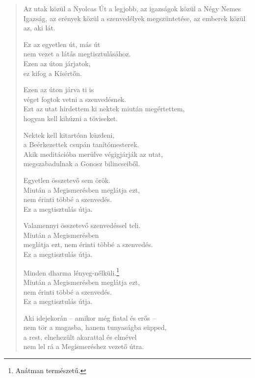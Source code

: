 
\begin{verse}

{\par%
\lettrine{A}{z} {\LettrineTextFont utak közül a Nyolcas Út a legjobb,}\newline
az igazságok közül a Négy Nemes Igazság,\newline
az erények közül a szenvedélyek megszüntetése,\verselinebreak
az emberek közül az, aki lát.
\par}

 Ez az egyetlen út, más út\\
nem vezet a látás megtisztulásához.\\
Ezen az úton járjatok,\\
ez kifog a Kísértőn.

 Ezen az úton járva ti is\\
véget fogtok vetni a szenvedésnek.\\
Ezt az utat hirdettem ki nektek miután megértettem,\\
hogyan kell kihúzni a töviseket.

 Nektek kell kitartóan küzdeni,\\
a Beérkezettek csupán tanítómesterek.\\
Akik meditációba merülve végigjárják az utat,\\
megszabadulnak a Gonosz bilincseiből.

 Egyetlen összetevő sem örök.\\
Miután a Megismerésben meglátja ezt,\\
nem érinti többé a szenvedés.\\
Ez a megtisztulás útja.

 Valamennyi összetevő szenvedéssel teli.\\
Miután a Megismerésben\\
meglátja ezt, nem érinti többé a szenvedés.\\
Ez a megtisztulás útja.

 Minden dharma lényeg-nélküli.\footnote{Anátman természetű.}\\
Miután a Megismerésben meglátja ezt,\\
nem érinti többé a szenvedés.\\
Ez a megtisztulás útja.

 Aki idejekorán – amikor még fiatal és erős –\\
nem tör a magasba, hanem tunyaságba süpped,\\
a rest, elnehezült akarattal és elmével\\
nem lel rá a Megismeréshez vezető útra.


\end{verse}
